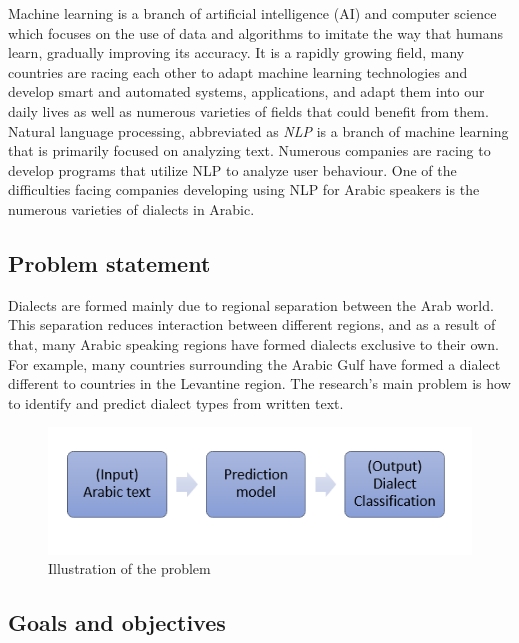 \documentclass[12pt]{diazessay}
\begin{document}
    Machine learning is a branch of artificial intelligence (AI) and computer science which focuses on the use of data and algorithms to imitate the way that humans learn, gradually improving its accuracy\cite{ibm_cloud_education_2020}. It is a rapidly growing field, many countries are racing each other to adapt machine learning technologies and develop smart and automated systems, applications, and adapt them into our daily lives as well as numerous varieties of fields that could benefit from them. Natural language processing, abbreviated as \textit{NLP} is a branch of machine learning that is primarily focused on analyzing text. Numerous companies are racing to develop programs that utilize NLP to analyze user behaviour. One of the difficulties facing companies developing using NLP for Arabic speakers is the numerous varieties of dialects in Arabic.


    \subsection{Problem statement}
    
    Dialects are formed mainly due to regional separation between the Arab world. This separation reduces interaction between different regions, and as a result of that, many Arabic speaking regions have formed dialects exclusive to their own. For example, many countries surrounding the Arabic Gulf have formed a dialect different to countries in the Levantine region. The research’s main problem is how to identify and predict dialect types from written text.

 
    \begin{figure}[h]
        \centering
        \includegraphics[scale=0.7]{Figures/problem_statment.png}
        \caption{Illustration of the problem}
        \label{fig:cmp}
    \end{figure}
        
    
    \subsection{Goals and objectives}
    
\end{document}
